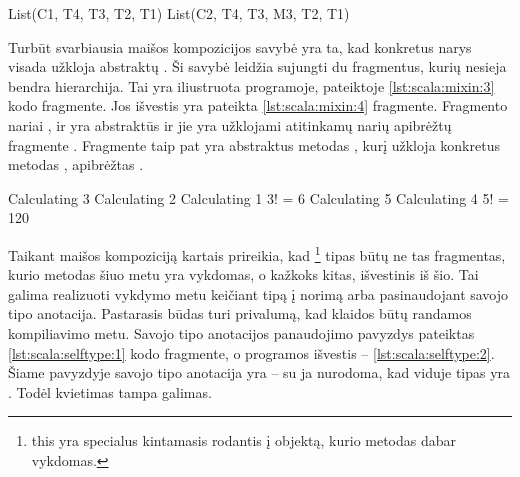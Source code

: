 \begin{listing}[H]
  \caption{Fragmentų hierarchijos modifikavimas.}
  \label{lst:scala:mixin:1}
\end{listing}

\begin{listing}[H]
  \begin{textcode}
    List(C1, T4, T3, T2, T1)
    List(C2, T4, T3, M3, T2, T1)
  \end{textcode}
  \caption{\ref{lst:scala:mixin:1} kodo fragmente pateiktos programos
  išvestis.}
  \label{lst:scala:mixin:2}
\end{listing}

Turbūt svarbiausia maišos kompozicijos savybė yra ta, kad konkretus
narys visada užkloja abstraktų
\cite[6]{scalable-component-abstractions}. Ši savybė leidžia
sujungti du fragmentus, kurių nesieja bendra hierarchija. Tai yra
iliustruota programoje, pateiktoje \ref{lst:scala:mixin:3} kodo
fragmente. Jos išvestis yra pateikta \ref{lst:scala:mixin:4}
fragmente. Fragmento  nariai
,  ir  yra abstraktūs
ir jie yra užklojami atitinkamų narių apibrėžtų fragmente
. Fragmente  taip pat yra
abstraktus metodas , kurį užkloja konkretus metodas
, apibrėžtas .

\begin{listing}[H]
  \caption{Maišos kompozicijos pavyzdys.}
  \label{lst:scala:mixin:3}
\end{listing}

\begin{listing}[H]
  \begin{textcode}
    Calculating 3
    Calculating 2
    Calculating 1
    3! = 6
    Calculating 5
    Calculating 4
    5! = 120
  \end{textcode}
  \caption{\ref{lst:scala:mixin:3} kodo fragmente pateiktos programos
  išvestis.}
  \label{lst:scala:mixin:4}
\end{listing}

Taikant maišos kompoziciją kartais prireikia, kad
\footnote{this yra specialus kintamasis rodantis į
objektą, kurio metodas dabar vykdomas.} tipas būtų ne tas fragmentas,
kurio metodas šiuo metu yra vykdomas, o kažkoks kitas, išvestinis
iš šio. Tai galima realizuoti vykdymo metu keičiant 
tipą į norimą arba pasinaudojant  savojo tipo
anotacija. Pastarasis būdas turi privalumą, kad klaidos būtų randamos
kompiliavimo metu. Savojo tipo anotacijos panaudojimo pavyzdys pateiktas
\ref{lst:scala:selftype:1} kodo fragmente, o programos išvestis
– \ref{lst:scala:selftype:2}. Šiame pavyzdyje savojo tipo anotacija
yra  – su ja nurodoma, kad 
viduje  tipas yra . Todėl kvietimas
 tampa galimas.

